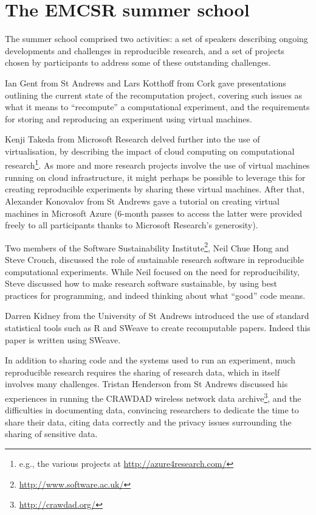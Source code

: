 \section{The EMCSR summer school}
\label{s:school}

The summer school comprised two activities: a set of speakers
describing ongoing developments and challenges in reproducible
research, and a set of projects chosen by participants to address some
of these outstanding challenges.

Ian Gent from St Andrews and Lars Kotthoff from Cork gave
presentations outlining the current state of the recomputation
project, covering such issues as what it means to ``recompute'' a
computational experiment, and the requirements for storing and
reproducing an experiment using virtual machines.

Kenji Takeda from Microsoft Research delved further into the use of
virtualisation, by describing the impact of cloud computing on
computational research\footnote{e.g., the various projects at
\url{http://azure4research.com/}}. As more and more research projects
involve the use of virtual machines running on cloud infrastructure,
it might perhaps be possible to leverage this for creating
reproducible experiments by sharing these virtual machines. After that,
Alexander Konovalov from St Andrews gave a tutorial on creating
virtual machines in Microsoft Azure (6-month passes to access the
latter were provided freely to all participants thanks to Microsoft Research's
generosity).

Two members of the Software Sustainability
Institute\footnote{\url{http://www.software.ac.uk/}}, Neil Chue Hong
and Steve Crouch, discussed the role of sustainable research software
in reproducible computational experiments. While Neil focused on the
need for reproducibility, Steve discussed how to make research
software sustainable, by using best practices for programming, and
indeed thinking about what ``good'' code means.

Darren Kidney from the University of St Andrews introduced the use of
standard statistical tools such as R and SWeave to create recomputable
papers. Indeed this paper is written using SWeave.

In addition to sharing code and the systems used to run an experiment,
much reproducible research requires the sharing of research data,
which in itself involves many challenges. Tristan Henderson from St
Andrews discussed his experiences in running the CRAWDAD wireless
network data archive\footnote{\url{http://crawdad.org/}}, and the
difficulties in documenting data, convincing researchers to dedicate
the time to share their data, citing data correctly and the privacy
issues surrounding the sharing of sensitive data.

